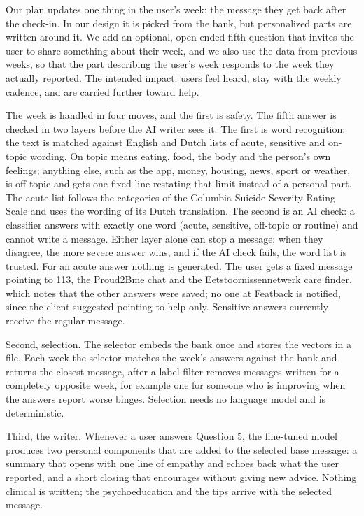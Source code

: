 \documentclass[a4paper]{article}
\begin{document}
Our plan updates one thing in the user's week: the message they get back after the check-in. In our design it is picked from the bank, but personalized parts are written around it. We add an optional, open-ended fifth question that invites the user to share something about their week, and we also use the data from previous weeks, so that the part describing the user's week responds to the week they actually reported. The intended impact: users feel heard, stay with the weekly cadence, and are carried further toward help.

The week is handled in four moves, and the first is safety. The fifth answer is checked in two layers before the AI writer sees it. The first is word recognition: the text is matched against English and Dutch lists of acute, sensitive and on-topic wording. On topic means eating, food, the body and the person's own feelings; anything else, such as the app, money, housing, news, sport or weather, is off-topic and gets one fixed line restating that limit instead of a personal part. The acute list follows the categories of the Columbia Suicide Severity Rating Scale \citep{posner2011} and uses the wording of its Dutch translation. The second is an AI check: a classifier answers with exactly one word (acute, sensitive, off-topic or routine) and cannot write a message. Either layer alone can stop a message; when they disagree, the more severe answer wins, and if the AI check fails, the word list is trusted. For an acute answer nothing is generated. The user gets a fixed message pointing to 113, the Proud2Bme chat and the Eetstoornissennetwerk care finder, which notes that the other answers were saved; no one at Featback is notified, since the client suggested pointing to help only. Sensitive answers currently receive the regular message.

Second, selection. The selector embeds the bank once and stores the vectors in a file. Each week the selector matches the week's answers against the bank and returns the closest message, after a label filter removes messages written for a completely opposite week, for example one for someone who is improving when the answers report worse binges. Selection needs no language model and is deterministic.

Third, the writer. Whenever a user answers Question 5, the fine-tuned model produces two personal components that are added to the selected base message: a summary that opens with one line of empathy and echoes back what the user reported, and a short closing that encourages without giving new advice. Nothing clinical is written; the psychoeducation and the tips arrive with the selected message.
\end{document}
